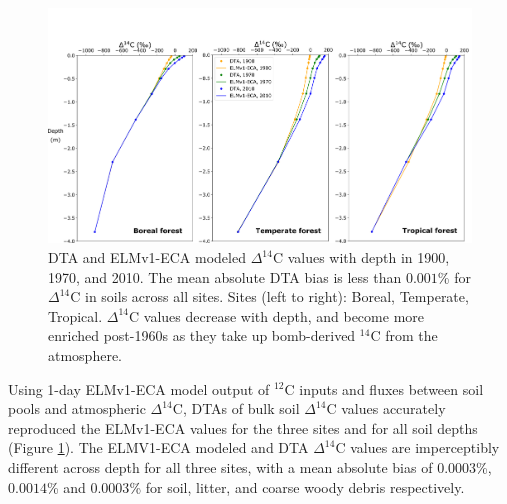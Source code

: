 \documentclass[11pt,a4paper]{article}
\begin{document}
\begin{figure}[htbp]
        \centering 
        \includegraphics[width=1.0\linewidth]{figs/depth_profile_10_manual_reorder_relabel.png}
        \caption{DTA and ELMv1-ECA modeled $\Delta^{14}$C values with depth in 1900, 1970, and 2010. The mean absolute DTA bias is less than $0.001$\% for $\Delta^{14}$C in soils across all sites. Sites (left to right): Boreal, Temperate, Tropical. $\Delta^{14}$C values decrease with depth, and become more enriched post-1960s as they take up bomb-derived $^{14}$C from the atmosphere.
        \label{fig:depthProfiles}
        }
\end{figure}      
             


Using 1-day ELMv1-ECA model output of $^{12}$C inputs and fluxes between soil pools and atmospheric $\Delta^{14}$C, DTAs of bulk soil $\Delta^{14}$C values accurately reproduced the ELMv1-ECA values for the three sites and for all soil depths (Figure \ref{fig:depthProfiles}). The ELMV1-ECA modeled and DTA $\Delta^{14}$C values are imperceptibly different across depth for all three sites, with a mean absolute bias of $0.0003$\%, $0.0014$\% and $0.0003$\% for soil, litter, and coarse woody debris respectively. 
\end{document}
